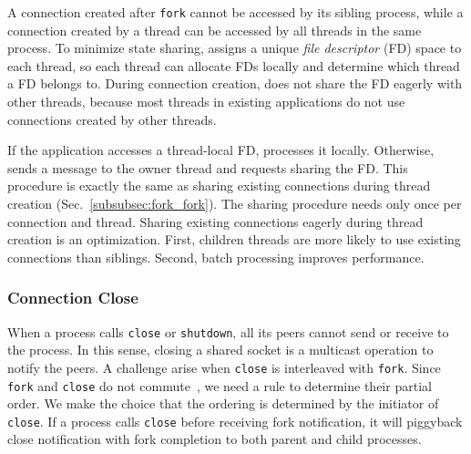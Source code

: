 A connection created after \texttt{fork} cannot be accessed by its sibling process, while a connection created by a thread can be accessed by all threads in the same process. To minimize state sharing, \libipc assigns a unique \textit{file descriptor} (FD) space to each thread, so each thread can allocate FDs locally and determine which thread a FD belongs to. During connection creation, \libipc does not share the FD eagerly with other threads, because most threads in existing applications do not use connections created by other threads.

If the application accesses a thread-local FD, \libipc processes it locally. Otherwise, \libipc sends a message to the owner thread and requests sharing the FD. This procedure is exactly the same as sharing existing connections during thread creation (Sec.~\ref{subsubsec:fork_fork}). The sharing procedure needs only once per connection and thread. Sharing existing connections eagerly during thread creation is an optimization. First, children threads are more likely to use existing connections than siblings. Second, batch processing improves performance.

\subsubsection{Connection Close}
\label{subsubsec:fork_close}



When a process calls \texttt{close} or \texttt{shutdown}, all its peers cannot send or receive to the process. In this sense, closing a shared socket is a multicast operation to notify the peers. A challenge arise when \texttt{close} is interleaved with \texttt{fork}. Since \texttt{fork} and \texttt{close} do not commute~\cite{clements2015scalable}, we need a rule to determine their partial order. We make the choice that the ordering is determined by the initiator of \texttt{close}. If a process calls \texttt{close} before receiving fork notification, it will piggyback close notification with fork completion to both parent and child processes.

